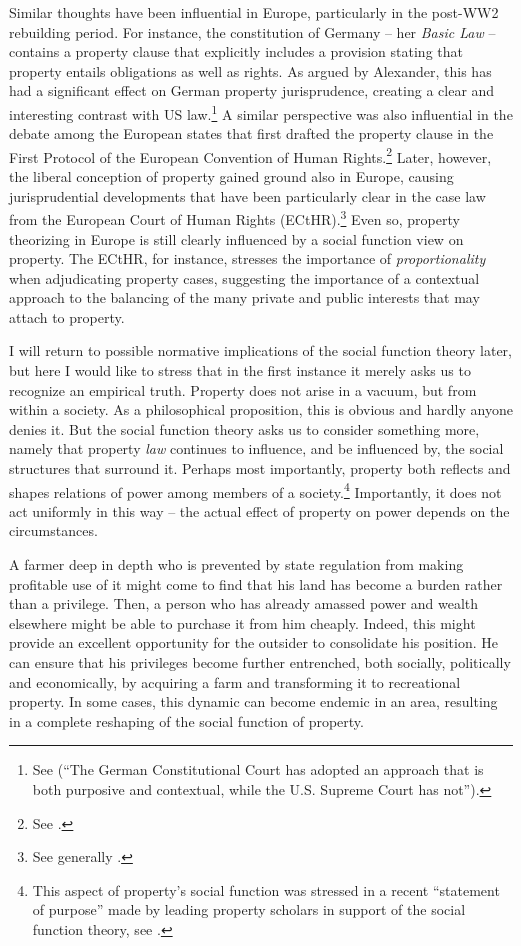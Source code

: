 Similar thoughts have been influential in Europe, particularly in the post-WW2 rebuilding period. For instance, the constitution of Germany -- her {\it Basic Law} -- contains a property clause that explicitly includes a provision stating that property entails obligations as well as rights. As argued by Alexander, this has had a significant effect on German property jurisprudence, creating a clear and interesting contrast with US law.\footnote{See \cite[338]{alexander03} (``The German Constitutional
Court has adopted an approach that is both purposive and contextual, while the U.S. Supreme Court has not'').} A similar perspective was also influential in the debate among the European states that first drafted the property clause in the First Protocol of the European Convention of Human Rights.\footnote{See \cite[1063-1065]{allen10}.} Later, however, the liberal conception of property gained ground also in Europe, causing jurisprudential developments that have been particularly clear in the case law from the European Court of Human Rights (ECtHR).\footnote{See generally \cite{allen10}.} Even so, property theorizing in Europe is still clearly influenced by a social function view on property. The ECtHR, for instance, stresses the importance of {\it proportionality} when adjudicating property cases, suggesting the importance of a contextual approach to the balancing of the many private and public interests that may attach to property. 

I will return to possible normative implications of the social function theory later, but here I would like to stress that in the first instance it merely asks us to recognize an empirical truth. Property does not arise in a vacuum, but from within a society. As a philosophical proposition, this is obvious and hardly anyone denies it. But the social function theory asks us to consider something more, namely that property {\it law} continues to influence, and be influenced by, the social structures that surround it. Perhaps most importantly, property both reflects and shapes relations of power among members of a society.\footnote{This aspect of property's social function was stressed in a recent ``statement of purpose'' made by leading property scholars in support of the social function theory, see \cite{alexandder09a}.} Importantly, it does not act uniformly in this way -- the actual effect of property on power depends on the circumstances.

A farmer deep in depth who is prevented by state regulation from making profitable use of it might come to find that his land has become a burden rather than a privilege. Then, a person who has already amassed power and wealth elsewhere might be able to purchase it from him cheaply. Indeed, this might provide an excellent opportunity for the outsider to consolidate his position. He can ensure that his privileges become further entrenched, both socially, politically and economically, by acquiring a farm and transforming it to recreational property. In some cases, this dynamic can become endemic in an area, resulting in a complete reshaping of the social function of property.


